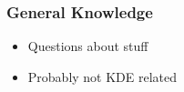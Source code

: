 \begin{frame}
 \frametitle{General Knowledge}

	\begin{itemize}
		\item Questions about stuff
		\item Probably not KDE related
	\end{itemize}
\end{frame}
